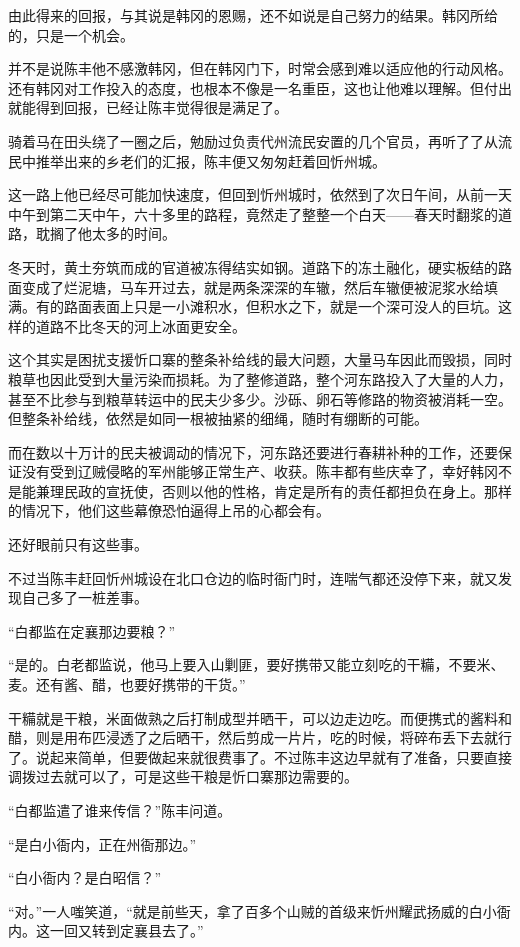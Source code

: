 由此得来的回报，与其说是韩冈的恩赐，还不如说是自己努力的结果。韩冈所给的，只是一个机会。

并不是说陈丰他不感激韩冈，但在韩冈门下，时常会感到难以适应他的行动风格。还有韩冈对工作投入的态度，也根本不像是一名重臣，这也让他难以理解。但付出就能得到回报，已经让陈丰觉得很是满足了。

骑着马在田头绕了一圈之后，勉励过负责代州流民安置的几个官员，再听了了从流民中推举出来的乡老们的汇报，陈丰便又匆匆赶着回忻州城。

这一路上他已经尽可能加快速度，但回到忻州城时，依然到了次日午间，从前一天中午到第二天中午，六十多里的路程，竟然走了整整一个白天——春天时翻浆的道路，耽搁了他太多的时间。

冬天时，黄土夯筑而成的官道被冻得结实如钢。道路下的冻土融化，硬实板结的路面变成了烂泥塘，马车开过去，就是两条深深的车辙，然后车辙便被泥浆水给填满。有的路面表面上只是一小滩积水，但积水之下，就是一个深可没人的巨坑。这样的道路不比冬天的河上冰面更安全。

这个其实是困扰支援忻口寨的整条补给线的最大问题，大量马车因此而毁损，同时粮草也因此受到大量污染而损耗。为了整修道路，整个河东路投入了大量的人力，甚至不比参与到粮草转运中的民夫少多少。沙砾、卵石等修路的物资被消耗一空。但整条补给线，依然是如同一根被抽紧的细绳，随时有绷断的可能。

而在数以十万计的民夫被调动的情况下，河东路还要进行春耕补种的工作，还要保证没有受到辽贼侵略的军州能够正常生产、收获。陈丰都有些庆幸了，幸好韩冈不是能兼理民政的宣抚使，否则以他的性格，肯定是所有的责任都担负在身上。那样的情况下，他们这些幕僚恐怕逼得上吊的心都会有。

还好眼前只有这些事。

不过当陈丰赶回忻州城设在北口仓边的临时衙门时，连喘气都还没停下来，就又发现自己多了一桩差事。

“白都监在定襄那边要粮？”

“是的。白老都监说，他马上要入山剿匪，要好携带又能立刻吃的干糒，不要米、麦。还有酱、醋，也要好携带的干货。”

干糒就是干粮，米面做熟之后打制成型并晒干，可以边走边吃。而便携式的酱料和醋，则是用布匹浸透了之后晒干，然后剪成一片片，吃的时候，将碎布丢下去就行了。说起来简单，但要做起来就很费事了。不过陈丰这边早就有了准备，只要直接调拨过去就可以了，可是这些干粮是忻口寨那边需要的。

“白都监遣了谁来传信？”陈丰问道。

“是白小衙内，正在州衙那边。”

“白小衙内？是白昭信？”

“对。”一人嗤笑道，“就是前些天，拿了百多个山贼的首级来忻州耀武扬威的白小衙内。这一回又转到定襄县去了。”

